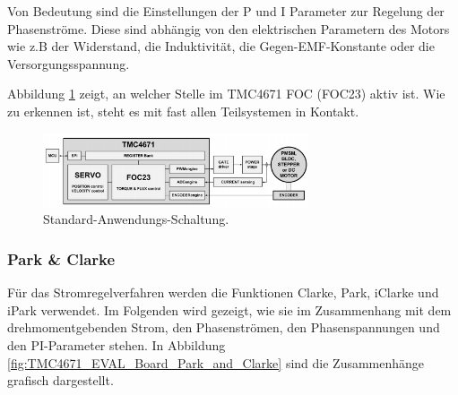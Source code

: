 Von Bedeutung sind die Einstellungen der P und I Parameter zur Regelung der Phasenströme. Diese sind abhängig von den elektrischen Parametern des Motors wie z.B der Widerstand, die Induktivität, die Gegen-EMF-Konstante oder die Versorgungsspannung. \cite{trinamic_datasheet_2018}

Abbildung \ref{fig:Blockdiagramm_TMC4671} zeigt, an welcher Stelle im TMC4671 FOC (FOC23) aktiv ist. Wie zu erkennen ist, steht es mit fast allen Teilsystemen in Kontakt.
\\

\begin{figure}[h!]
	\centering
	\includegraphics[width=0.7\textwidth]{graphics/Blockdiagramm_TMC4671.png}
	\caption{Standard-Anwendungs-Schaltung. \cite{trinamic_datasheet_2018}}
	\label{fig:Blockdiagramm_TMC4671}
\end{figure}
\newpage

\subsubsection{Park \& Clarke}

Für das Stromregelverfahren werden die Funktionen Clarke, Park, iClarke und iPark verwendet. Im Folgenden wird gezeigt, wie sie im Zusammenhang mit dem drehmomentgebenden Strom, den Phasenströmen, den Phasenspannungen und den PI-Parameter stehen. In Abbildung \ref{fig:TMC4671_EVAL_Board_Park_and_Clarke} sind die Zusammenhänge grafisch dargestellt.


